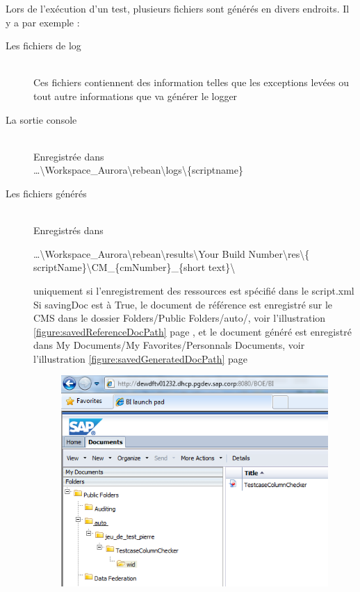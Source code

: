 Lors de l'ex\'{e}cution d'un test, plusieurs fichiers sont g\'{e}n\'{e}r\'{e}s en divers endroits. Il y a par exemple :
\begin{description}
\item[Les fichiers de log] \hfill \\ Ces fichiers contiennent des information telles que les exceptions levées ou tout autre informations que va générer le logger
\item[La sortie console] \hfill \\
Enregistr\'{e}e dans \\ \ldots\textbackslash{}Workspace\_Aurora\textbackslash{}rebean\textbackslash{}logs\textbackslash{}\{scriptname\}
\item[Les fichiers g\'{e}n\'{e}r\'{e}s] \hfill \\
Enregistr\'{e}s dans \begin{sloppypar} \ldots\textbackslash{}Workspace\_Aurora\textbackslash{}rebean\textbackslash{}results\textbackslash{}Your Build Number\textbackslash{}res\textbackslash{}\{ scriptName\}\textbackslash{}CM\_\{cmNumber\}\_\{short text\}\textbackslash{}\end{sloppypar}uniquement si l'enregistrement des ressources est sp\'{e}cifi\'{e} dans le script.xml\\
Si savingDoc est \`{a} True, le document de r\'{e}f\'{e}rence est enregistr\'{e} sur le CMS dans le dossier Folders/Public Folders/auto/, voir l'illustration \ref{figure:savedReferenceDocPath} page \pageref{figure:savedReferenceDocPath}, et le document g\'{e}n\'{e}r\'{e} est enregistr\'{e} dans My Documents/My Favorites/Personnals Documents, voir l'illustration \ref{figure:savedGeneratedDocPath} page \pageref{figure:savedGeneratedDocPath}
\begin{figure}[H]
  \centering
      \includegraphics{images/savedReferenceDocPath.png}

\end{figure}
\end{description}
